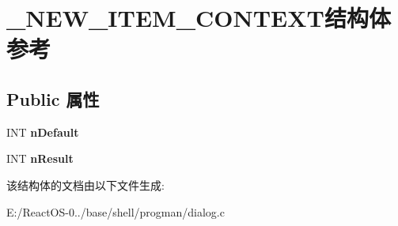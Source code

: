 \hypertarget{struct___n_e_w___i_t_e_m___c_o_n_t_e_x_t}{}\section{\+\_\+\+N\+E\+W\+\_\+\+I\+T\+E\+M\+\_\+\+C\+O\+N\+T\+E\+X\+T结构体 参考}
\label{struct___n_e_w___i_t_e_m___c_o_n_t_e_x_t}
\subsection*{Public 属性}
\begin{DoxyCompactItemize}
\item 
\mbox{\label{struct___n_e_w___i_t_e_m___c_o_n_t_e_x_t_a153c6d09669d4f5a02c65d1ecf630bd0}} 
I\+NT {\bfseries n\+Default}
\item 
\mbox{\label{struct___n_e_w___i_t_e_m___c_o_n_t_e_x_t_ac401aa866708a441d2aadb43bdffb9dd}} 
I\+NT {\bfseries n\+Result}
\end{DoxyCompactItemize}


该结构体的文档由以下文件生成\+:\begin{DoxyCompactItemize}
\item 
E\+:/\+React\+O\+S-\/0../base/shell/progman/dialog.\+c\end{DoxyCompactItemize}
